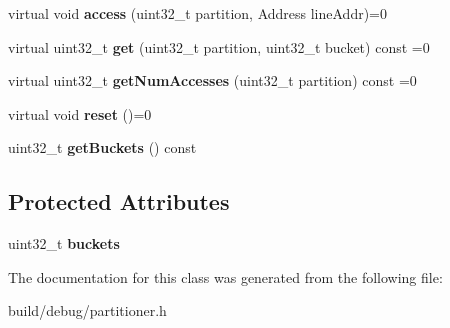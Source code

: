\begin{DoxyCompactItemize}
\item 
\hypertarget{classPartitionMonitor_ad8069e2e85d1258e0048cd3063897a43}{virtual void {\bfseries access} (uint32\-\_\-t partition, Address line\-Addr)=0}\label{classPartitionMonitor_ad8069e2e85d1258e0048cd3063897a43}

\item 
\hypertarget{classPartitionMonitor_a56745f29286e5ac23ce377d71b959226}{virtual uint32\-\_\-t {\bfseries get} (uint32\-\_\-t partition, uint32\-\_\-t bucket) const =0}\label{classPartitionMonitor_a56745f29286e5ac23ce377d71b959226}

\item 
\hypertarget{classPartitionMonitor_a0fc28e3e100251f131f5232c405d0495}{virtual uint32\-\_\-t {\bfseries get\-Num\-Accesses} (uint32\-\_\-t partition) const =0}\label{classPartitionMonitor_a0fc28e3e100251f131f5232c405d0495}

\item 
\hypertarget{classPartitionMonitor_ab12bee1a4397eb8ddf621e3bf58edea1}{virtual void {\bfseries reset} ()=0}\label{classPartitionMonitor_ab12bee1a4397eb8ddf621e3bf58edea1}

\item 
\hypertarget{classPartitionMonitor_a328f7bd7b831a8834e559d87bf554d92}{uint32\-\_\-t {\bfseries get\-Buckets} () const }\label{classPartitionMonitor_a328f7bd7b831a8834e559d87bf554d92}

\end{DoxyCompactItemize}
\subsection*{Protected Attributes}
\begin{DoxyCompactItemize}
\item 
\hypertarget{classPartitionMonitor_a99908dc1baef7cdfd0b7c1d9f8a9ff47}{uint32\-\_\-t {\bfseries buckets}}\label{classPartitionMonitor_a99908dc1baef7cdfd0b7c1d9f8a9ff47}

\end{DoxyCompactItemize}


The documentation for this class was generated from the following file\-:\begin{DoxyCompactItemize}
\item 
build/debug/partitioner.\-h\end{DoxyCompactItemize}
